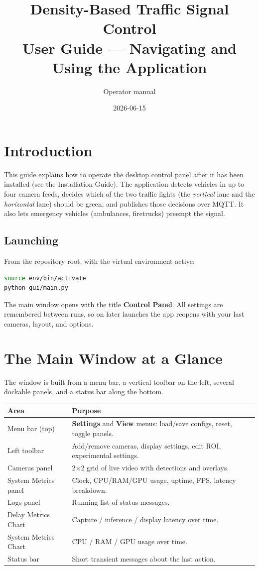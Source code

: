 \documentclass[11pt]{article}
\title{Density-Based Traffic Signal Control \\ \large User Guide --- Navigating and Using the Application}
\author{Operator manual}
\date{2026-06-15}
\newcommand{\ui}[1]{\textbf{#1}}
\begin{document}
\maketitle

\tableofcontents
\bigskip

\section{Introduction}
This guide explains how to operate the desktop control panel after it has been
installed (see the Installation Guide). The application detects vehicles in up
to four camera feeds, decides which of the two traffic lights (the
\emph{vertical} lane and the \emph{horizontal} lane) should be green, and
publishes those decisions over MQTT. It also lets emergency vehicles
(ambulances, firetrucks) preempt the signal.

\subsection{Launching}
From the repository root, with the virtual environment active:
\begin{lstlisting}[language=bash]
source env/bin/activate
python gui/main.py
\end{lstlisting}
The main window opens with the title \ui{Control Panel}. All settings are
remembered between runs, so on later launches the app reopens with your last
cameras, layout, and options.

\section{The Main Window at a Glance}
The window is built from a menu bar, a vertical toolbar on the left, several
dockable panels, and a status bar along the bottom.

\begin{table}[h]
\centering
\begin{tabular}{@{}lp{10.5cm}@{}}
\toprule
\textbf{Area} & \textbf{Purpose} \\
\midrule
Menu bar (top) & \ui{Settings} and \ui{View} menus: load/save configs, reset, toggle panels. \\
Left toolbar & Add/remove cameras, display settings, edit ROI, experimental settings. \\
Cameras panel & 2$\times$2 grid of live video with detections and overlays. \\
System Metrics panel & Clock, CPU/RAM/GPU usage, uptime, FPS, latency breakdown. \\
Logs panel & Running list of status messages. \\
Delay Metrics Chart & Capture / inference / display latency over time. \\
System Metrics Chart & CPU / RAM / GPU usage over time. \\
Status bar & Short transient messages about the last action. \\
\bottomrule
\end{tabular}
\end{table}
\end{document}
